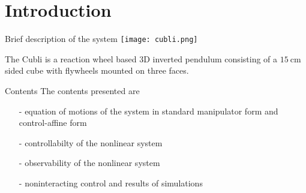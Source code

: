 \section{Introduction}
\begin{frame}{Brief description of the system}
  \centering
  \texttt{[image: cubli.png]}
  \par
The Cubli is a reaction wheel based 3D inverted pendulum consisting of a $\SI{15}{\centi\meter}$
sided cube with flywheels mounted on three faces.
\end{frame}

\begin{frame}{Contents}
  The contents presented are
  \begin{itemize}
  \item[-] equation of motions of the system in standard manipulator form and control-affine form
  \item[-] controllabilty of the nonlinear system
  \item[-] observability of the nonlinear system
  \item[-] noninteracting control and results of simulations
  \end{itemize}
\end{frame}
